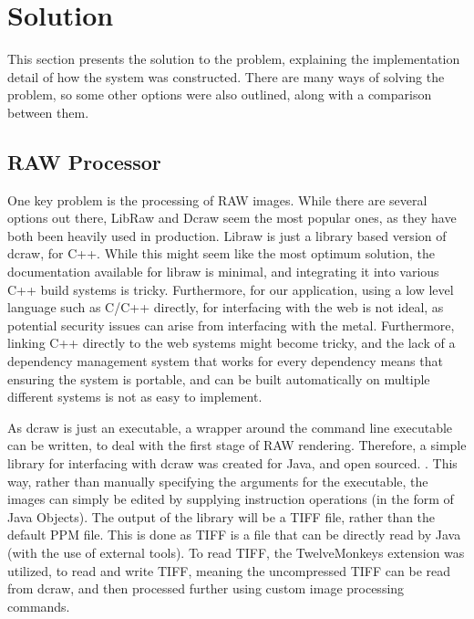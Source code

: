 \documentclass[10pt,a4paper]{article}
\begin{document}
\section{Solution}
This section presents the solution to the problem, explaining the implementation detail of how the system was constructed. There are many ways 
of solving the problem, so some other options were also outlined, along with a comparison between them.

\subsection{RAW Processor}
One key problem is the processing of RAW images. While there are several options out there, LibRaw and Dcraw seem the most popular ones, 
as they have both been heavily used in production. Libraw is just a library based version of dcraw, for C++. While this might seem like the most optimum
solution, the documentation available for libraw is minimal, and integrating it into various C++ build systems is tricky. Furthermore, for our application,
using a low level language such as C/C++ directly, for interfacing with the web is not ideal, as potential security issues can arise from interfacing with the
metal. Furthermore, linking C++ directly to the web systems might become tricky, and the lack of a dependency management system that works for every dependency
means that ensuring the system is portable, and can be built automatically on multiple different systems is not as easy to implement.

As dcraw is just an executable, a wrapper around the command line executable can be written, to deal with the first stage of RAW rendering.
Therefore, a simple library for interfacing with dcraw was created for Java, and open sourced. \cite{JDCRAW}. This way, rather than manually
specifying the arguments for the executable, the images can simply be edited by supplying instruction operations (in the form of Java Objects).
The output of the library will be a TIFF file, rather than the default PPM file. This is done as TIFF is a file that can be directly read by
Java (with the use of external tools). To read TIFF, the TwelveMonkeys extension \cite{TwelveMonkeys} was utilized, to read and write TIFF, meaning
the uncompressed TIFF can be read from dcraw, and then processed further using custom image processing commands. 
\end{document}
